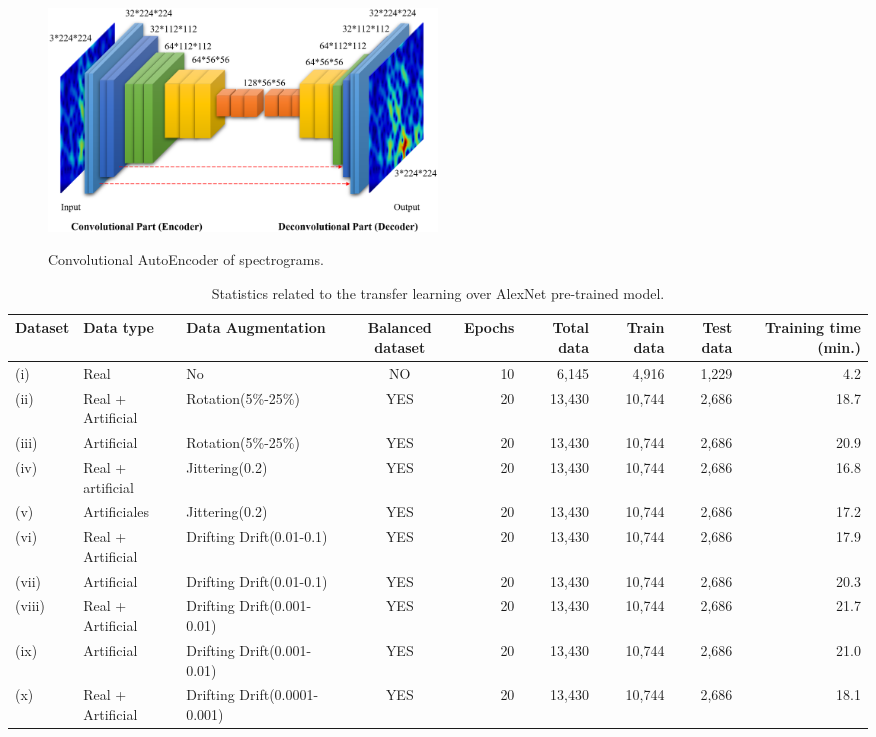 \documentclass[journal]{IEEEtran}
\begin{document}
\begin{figure}
\centering
{\includegraphics[width=0.5\textwidth,keepaspectratio]{img/cae.png}}
\caption{Convolutional AutoEncoder of spectrograms.}
\label{fig:cae_interpolation}
\end{figure}




\begin{table}
\caption{Statistics related to the transfer learning over AlexNet pre-trained model.}
\centering
\begin{adjustbox}{width=\textwidth}
\begin{tabular}{lllcrrrrr}
\hline\hline %
Dataset & Data type & Data Augmentation & Balanced dataset & Epochs & Total data & Train data & Test data & Training time (min.) \\
\hline %
(i) & Real & No & NO & 10 & 6,145 & 4,916 & 1,229 & 4.2 \\
(ii) & Real + Artificial & Rotation(5\%-25\%) & YES & 20 & 13,430 & 10,744 & 2,686 & 18.7 \\
(iii) & Artificial & Rotation(5\%-25\%) & YES & 20 & 13,430 & 10,744 & 2,686 & 20.9 \\
(iv) & Real + artificial & Jittering(0.2) & YES & 20 & 13,430 & 10,744 & 2,686 & 16.8 \\
(v) & Artificiales & Jittering(0.2) & YES & 20 & 13,430 & 10,744 & 2,686 & 17.2 \\
(vi) & Real + Artificial & Drifting Drift(0.01-0.1) & YES & 20 & 13,430 & 10,744 & 2,686 & 17.9 \\
(vii) & Artificial & Drifting
  Drift(0.01-0.1) & YES & 20 & 13,430 & 10,744 & 2,686 & 20.3 \\
(viii) & Real + Artificial & Drifting Drift(0.001-0.01) & YES & 20 & 13,430 & 10,744 & 2,686 & 21.7 \\
(ix) & Artificial & Drifting
  Drift(0.001-0.01) & YES & 20 & 13,430 & 10,744 & 2,686 & 21.0 \\
(x) & Real + Artificial & Drifting Drift(0.0001-0.001) & YES & 20 & 13,430 & 10,744 & 2,686 & 18.1 \\

\end{tabular}
\end{adjustbox}
\end{table}
\end{document}
